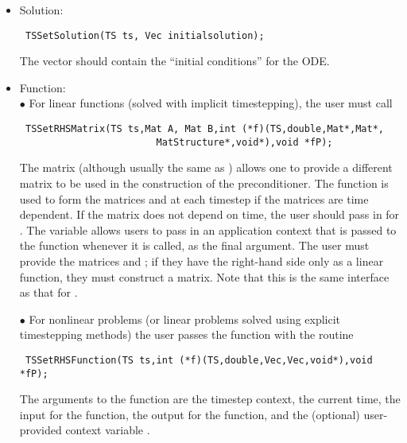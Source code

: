 \begin{itemize}
\item Solution:\\
\begin{verbatim}
 TSSetSolution(TS ts, Vec initialsolution);
\end{verbatim}
The vector  should contain the ``initial conditions''
for the ODE. 

\item Function: \\
\subitem $ \bullet $ For linear functions (solved with implicit timestepping),
 the user must call 
\begin{verbatim}
 TSSetRHSMatrix(TS ts,Mat A, Mat B,int (*f)(TS,double,Mat*,Mat*,
                        MatStructure*,void*),void *fP);
\end{verbatim}
The matrix  (although usually the same as ) allows one to 
provide 
a different matrix to be used in the construction of the preconditioner.
The function  is used to form the matrices  and  
at each timestep if the matrices are time dependent.
If the matrix does not depend on time, the user should 
pass in  for .  The variable  allows 
users to pass in an application context that is passed to the  function 
whenever it is called, as the final argument. The user must provide the matrices
 and ; if they have the right-hand side only as a linear
function, they must construct a  matrix. Note that this is 
the same interface as that for . 

\subitem $ \bullet $  For nonlinear problems (or linear problems solved using
explicit timestepping methods) the user  passes the function with 
the routine

\begin{verbatim}
 TSSetRHSFunction(TS ts,int (*f)(TS,double,Vec,Vec,void*),void *fP);
\end{verbatim}
The  arguments to the function  are
the timestep context, the current time, the input for the function,
the output for the function, and the (optional) user-provided context
variable .


\end{itemize}
